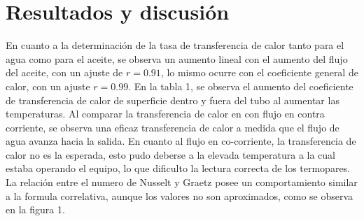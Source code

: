 \documentclass[journal, a4paper]{IEEEtran}
\begin{document}
\setlength{\parskip}{0.1 pt}

\section{Resultados y discusi\'on}
	 En cuanto a la determinaci\'on de la tasa de transferencia de calor tanto para el agua como para el aceite, se observa un aumento lineal con el aumento del flujo del aceite, con un ajuste de $r=0.91$, lo mismo ocurre con el coeficiente general de calor, con un ajuste $r=0.99$.
En la tabla 1, se observa el aumento del coeficiente de transferencia de calor de superficie dentro y fuera del tubo al aumentar las temperaturas.
Al comparar la transferencia de calor en con flujo en contra corriente, se observa una eficaz transferencia de calor a medida que el flujo de agua avanza hacia la salida. En cuanto al flujo en co-corriente, la transferencia de calor no es la esperada, esto pudo deberse a la elevada temperatura a la cual estaba operando el equipo, lo que dificulto la lectura correcta de los termopares.
La relaci\'on entre el numero de Nusselt y Graetz posee un comportamiento similar a la formula correlativa, aunque los valores no son aproximados, como se observa en la figura 1.

\setlength{\intextsep}{0.3 pt} %
 
	\begin{table}[H] %
		\begin{center}
		\caption{Determinaci\'on de la tasa de transferencia de calor, diferencia de temperatura media logaritmica y coeficiente global de transferencia de calor}
		\label{tabla:parte1}
		\end{center}
	\end{table}
    
\end{document}
